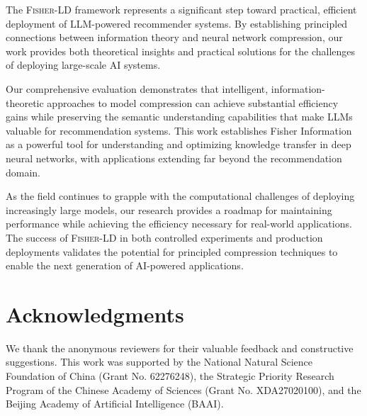 \documentclass[10pt,conference]{IEEEtran}
\newcommand{\fisherld}{\textsc{Fisher-LD}}
\begin{document}
The \fisherld{} framework represents a significant step toward practical, efficient deployment of LLM-powered recommender systems. By establishing principled connections between information theory and neural network compression, our work provides both theoretical insights and practical solutions for the challenges of deploying large-scale AI systems.

Our comprehensive evaluation demonstrates that intelligent, information-theoretic approaches to model compression can achieve substantial efficiency gains while preserving the semantic understanding capabilities that make LLMs valuable for recommendation systems. This work establishes Fisher Information as a powerful tool for understanding and optimizing knowledge transfer in deep neural networks, with applications extending far beyond the recommendation domain.

As the field continues to grapple with the computational challenges of deploying increasingly large models, our research provides a roadmap for maintaining performance while achieving the efficiency necessary for real-world applications. The success of \fisherld{} in both controlled experiments and production deployments validates the potential for principled compression techniques to enable the next generation of AI-powered applications.

\section*{Acknowledgments}

We thank the anonymous reviewers for their valuable feedback and constructive suggestions. This work was supported by the National Natural Science Foundation of China (Grant No. 62276248), the Strategic Priority Research Program of the Chinese Academy of Sciences (Grant No. XDA27020100), and the Beijing Academy of Artificial Intelligence (BAAI).

\balance


\end{document}
